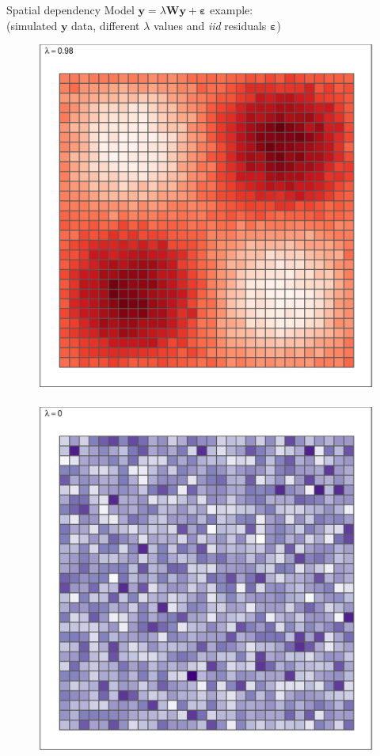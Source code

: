 \documentclass{beamer}
\begin{document}
\begin{frame}{Spatial dependency}
Model $\bm{y} = \lambda \bm{W\!y} + \bm{\varepsilon}$ example: \\(simulated $\bm{y}$ data, different $\lambda$ values and \textit{iid} residuals $\bm{\varepsilon}$)
\vspace{-0.3cm}
\begin{figure}[htbp]
  \centering
{}
  \includegraphics[trim=1cm 0cm 1cm 0cm, clip=true]{IMG/Plot3_Positive.eps}\,%
  \includegraphics[trim=1cm 0cm 1cm 0cm, clip=true]{IMG/Plot2_noise.eps}\,%

\end{figure}
\end{frame}
\end{document}
